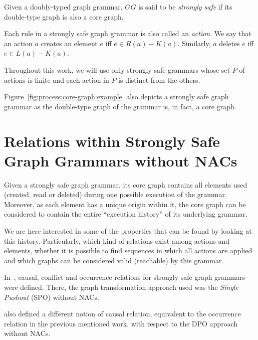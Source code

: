 \begin{definition} Given \doublyTypedGraphGrammarCore{} a doubly-typed graph grammar, $GG$ is said to be \emph{strongly safe} if its double-type graph is also a core graph.

  Each rule in a strongly safe graph grammar is also called an \emph{action}. We say that an action $a$ creates an element $e$ iff $e \in R(a) - K(a)$. Similarly, $a$ deletes $e$ iff \mbox{$e \in L(a) - K(a)$}.
\end{definition}

\begin{remark} Throughout this work, we will use only strongly safe grammars whose set $P$ of actions is finite and each action in $P$ is distinct from the others.
\end{remark}

\begin{example} Figure~\ref{fig:process:core-graph:example} also depicts a strongly safe graph grammar as the double-type graph of the grammar is, in fact, a core graph.
\end{example}

\section{Relations within Strongly Safe Graph Grammars without NACs}

Given a strongly safe graph grammar, its core graph contains all elements used (created, read or deleted) during one possible execution of the grammar. Moreover, as each element has a unique origin within it, the core graph can be considered to contain the entire ``execution history'' of its underlying grammar.

We are here interested in some of the properties that can be found by looking at this history. Particularly, which kind of relations exist among actions and elements, whether it is possible to find sequences in which all actions are applied and which graphs can be considered valid (reachable) by this grammar.

In~\cite{Ribeiro1996}, causal, conflict and occurrence relations for strongly safe graph grammars were defined. There, the graph transformation approach used was the \emph{Single Pushout} (SPO) without NACs.

\cite{Corradini1996} also defined a different notion of causal relation, equivalent to the occurrence relation in the previous mentioned work, with respect to the DPO approach without NACs.

